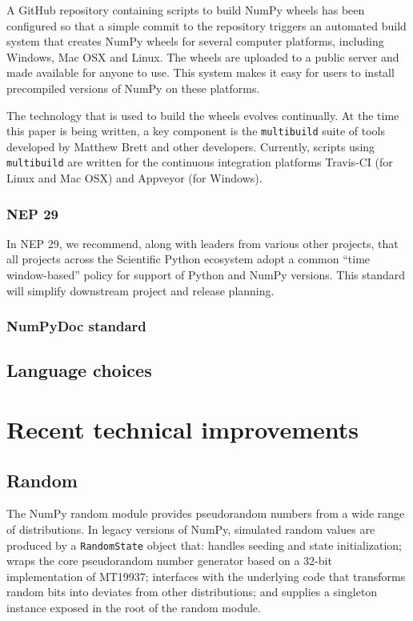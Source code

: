 \documentclass[fleqn,10pt]{wlscirep}
\newcommand{\code}[1]{\texttt{#1}}
\begin{document}
A GitHub repository containing scripts to build NumPy wheels has
been configured so that a simple commit to the repository triggers
an automated build system that creates NumPy wheels for several
computer platforms, including Windows, Mac OSX and Linux.  The wheels
are uploaded to a public server and made available for anyone to use.
This system makes it easy for users to install precompiled versions
of NumPy on these platforms.

The technology that is used to build the wheels evolves continually.
At the time this paper is being written, a key component is the
\code{multibuild} suite of tools developed by Matthew Brett and
other developers\cite{multibuild}.  Currently, scripts using
\code{multibuild} are written for the continuous integration
platforms Travis-CI (for Linux and Mac OSX) and Appveyor
(for Windows).


\subsubsection*{NEP 29}

In NEP 29, we recommend, along with leaders from various other
projects, that all projects across the Scientific Python ecosystem
adopt a common ``time window-based'' policy for support of Python and
NumPy versions. This standard will simplify downstream project and
release planning.

\subsubsection*{NumPyDoc standard}


\subsection*{Language choices}

\section*{Recent technical improvements}

\subsection*{Random}

The NumPy random module provides pseudorandom numbers from a wide range of
distributions. In legacy versions of NumPy, simulated random values are produced
by a \code{RandomState} object that: handles seeding and state initialization;
wraps the core pseudorandom number generator based on a 32-bit implementation of
MT19937; interfaces with the underlying code that transforms random bits into
deviates from other distributions; and supplies a singleton instance exposed in
the root of the random module.
\end{document}
